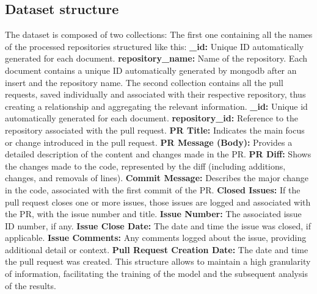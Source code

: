 \subsection{Dataset structure}
The dataset is composed of two collections:
The first one containing all the names of the processed repositories structured like this:
\newline
\textbf{\_id:} Unique ID automatically generated for each document.
\newline
\textbf{repository\_name:} Name of the repository.
\newline
Each document contains a unique ID automatically generated by mongodb after an insert and the repository name.
The second collection contains all the pull requests, saved individually and associated with their respective repository, thus creating a relationship and aggregating the relevant information.
\newline
\textbf{\_id:} Unique id automatically generated for each document.
\newline
\textbf{repository\_id:} Reference to the repository associated with the pull request.
\newline
\textbf{PR Title:} Indicates the main focus or change introduced in the pull request.
\newline
\textbf{PR Message (Body):} Provides a detailed description of the content and changes made in the PR.
\newline
\textbf{PR Diff:} Shows the changes made to the code, represented by the diff (including additions, changes, and removals of lines).
\newline
\textbf{Commit Message:} Describes the major change in the code, associated with the first commit of the PR.
\newline
\textbf{Closed Issues:} If the pull request closes one or more issues, those issues are logged and associated with the PR, with the issue number and title.
\newline
\textbf{Issue Number:} The associated issue ID number, if any.
\newline
\textbf{Issue Close Date:} The date and time the issue was closed, if applicable.
\newline
\textbf{Issue Comments:} Any comments logged about the issue, providing additional detail or context.
\newline
\textbf{Pull Request Creation Date:} The date and time the pull request was created.
\newline
This structure allows to maintain a high granularity of information, facilitating the training of the model and the subsequent analysis of the results.
